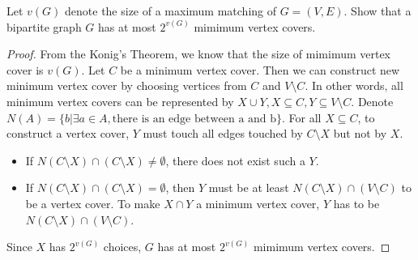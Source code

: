 



    \maketitle
    \begin{thm}{}{}
        Let $v(G)$ denote the size of a maximum matching of $G=(V,E)$.
        Show that a bipartite graph $G$ has at most $2^{v(G)}$ mimimum vertex covers.
    \end{thm}
    \begin{proof}
        From the Konig's Theorem, we know that the size of mimimum vertex cover is $v(G)$.
        Let $C$ be a minimum vertex cover.
        Then we can construct new minimum vertex cover by choosing vertices from $C$ and $V\setminus C$.
        In other words, all minimum vertex covers can be represented by $X\cup Y, X\subseteq C,Y\subseteq V\setminus C$.
        Denote $N(A)=\{b|\exists a\in A, \text{there is an edge between a and b}\}$.
        For all $X\subseteq C$, to construct a vertex cover, $Y$ must touch all edges touched by $C\setminus X$ but not by $X$.
        \begin{itemize}
            \item If $N(C\setminus X)\cap (C\setminus X)\ne \emptyset$, there does not exist such a $Y$.
            \item  If $N(C\setminus X)\cap (C\setminus X)= \emptyset$, then $Y$ must be at least $N(C\setminus X) \cap (V\setminus C)$ to be a vertex cover.
            To make $X\cap Y$ a minimum vertex cover, $Y$ has to be $N(C\setminus X) \cap (V\setminus C)$.
        \end{itemize}

        Since $X$ has $2^{v(G)}$ choices, $G$ has at most $2^{v(G)}$ mimimum vertex covers.
    \end{proof}

